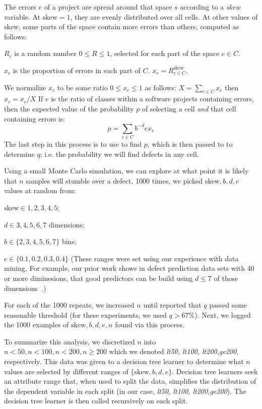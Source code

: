     The  errors $e$ of a project are spread around that space $s$ according to a {\em skew} variable. At $\textrm{skew}=1$, they are evenly distributed over all cells.
    At other values of $\textrm{skew}$, some parts of the space contain more errors than others, computed as follows:
    \bi
  \item $R_c$ is a random number $0\le R \le 1$, selected for each part of the space $c\in C$.
  \item $x_c$ is the proportion of errors in each part of $C$. \mbox{$x_c =  R_{c\in C}^\textrm{skew}$}.
  \item We normalize $x_c$ to be some ratio $0 \le x_c \le 1$ as follows: $X= \sum_{c\in C} x_c$ then $x_c = x_c/X$
    \ei
    If  $e$ is the ratio of classes within a software projects containing errors, then 
    the expected value of the probability $p$ of selecting a cell {\em and} that cell containing errors is:
    \begin{equation}\label{eq:p}
      p = \sum_{c\in C}b^{-d}ex_c
    \end{equation}
    The last step in this process is to use  to find $p$, which is then passed to  to determine $q$;
    i.e. the probability we
    will find defects in any cell.

    Using a small Monte Carlo simulation, we can explore at what point it is likely that $n$ samples will stumble over a defect. 
    1000 times, we picked $\textrm{skew},b,d,e$ values at random from:
    \bi
      \item $\textrm{skew} \in {1,2,3,4,5}$;
  \item $d \in {3,4,5,6,7}$ dimensions;
  \item $b \in \{2,3,4,5,6,7\}$ bins; 
    \item $e\in \{0.1,0.2,0.3,0.4\}$
      \ei
      (These ranges were set using our experience with data mining, For example, our prior work shows in defect prediction data sets
      with 40 or more diminesions, that good predictors can be build using $d\le 7$ of those dimensions~\cite{me07a}.)
      
    For each of the 1000 repeats,
     we increased $n$ until  reported that $q$ passed some reasonable threshold (for these experiments, we used $q>67\%$).
     Next, we logged the 1000 examples of   $\textrm{skew},b,d,e,n$ found via this process.
     
    To summarize this analysis, we discretized $n$ into $n<50, n<100, n<200,n\ge200$ which we denoted {\em lt50, lt100, lt200,ge200}, respectively.
    This data was given to a decision tree learner to determine what $n$ values are selected by different
    ranges of $\{\textrm{skew},b,d,e\}$. Decision tree learners seek an attribute range that, when used to split the data,
      simplifies the distribution of the dependent variable in each split (in our case, {\em lt50, lt100, lt200,ge200}).
      The decision tree learner is then called recursively on each split.

